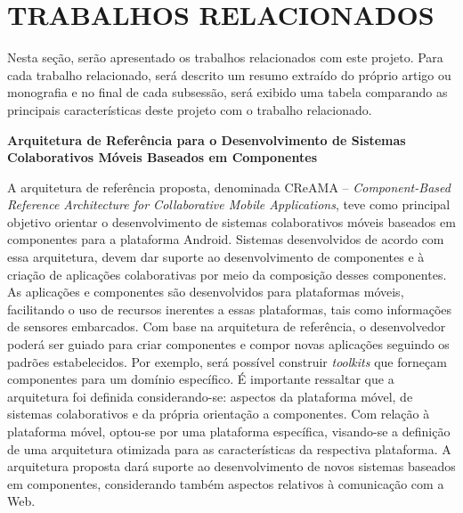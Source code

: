 
\section{TRABALHOS RELACIONADOS}
Nesta seção, serão apresentado os trabalhos relacionados com este projeto. Para cada trabalho relacionado, será descrito um resumo extraído do próprio artigo ou monografia e no final de cada subsessão, será exibido uma tabela comparando as principais características deste projeto com o trabalho relacionado.\par

\textbf{Arquitetura de Referência para o Desenvolvimento de Sistemas Colaborativos Móveis Baseados em Componentes} \cite{melotti_2014}
\par
A arquitetura de referência proposta, denominada CReAMA – \textit{Component-Based Reference Architecture for Collaborative Mobile Applications}, teve como principal objetivo orientar o desenvolvimento de sistemas colaborativos móveis baseados em componentes para a plataforma Android. Sistemas desenvolvidos de acordo com essa arquitetura, devem dar suporte ao desenvolvimento de componentes e à criação de aplicações colaborativas por meio da composição desses componentes. As aplicações e componentes são desenvolvidos para plataformas móveis, facilitando o uso de recursos inerentes a essas plataformas, tais como informações de sensores embarcados. Com base na arquitetura de referência, o desenvolvedor poderá ser guiado para criar componentes e compor novas aplicações seguindo os padrões estabelecidos. Por exemplo, será possível construir \textit{toolkits} que forneçam componentes para um domínio específico. É importante ressaltar que a arquitetura foi definida considerando-se: aspectos da plataforma móvel, de sistemas colaborativos e da própria orientação a componentes. Com relação à plataforma móvel, optou-se por uma plataforma específica, visando-se a definição de uma arquitetura otimizada para as características da respectiva plataforma. A arquitetura proposta dará suporte ao desenvolvimento de novos sistemas baseados em componentes, considerando também aspectos relativos à comunicação com a Web.\par

